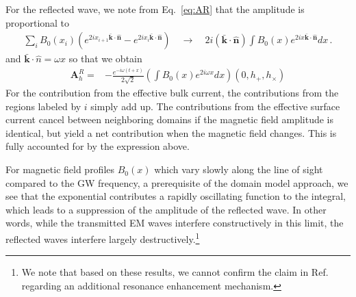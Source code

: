 \documentclass[a4paper,11pt]{article}
\begin{document}
For the reflected wave, we note from Eq.~\eqref{eq:AR} that the amplitude is proportional to
\begin{align}
 \sum_i  B_0(x_{i} ) \left( e^{2 i x_{i+1} \bar{\bm k}\cdot\hat{\bm n}} - e^{2 i x_{i} \bar{\bm k}\cdot\hat{\bm n}} \right) 
 \quad \rightarrow \quad 2 i (\bar{\bm{k}} \cdot \hat{\bm n}) \int B_0 (x) e^{2 i x \bar{\bm k} \cdot \hat{\bm n}} dx \,.
\end{align}
%
and $\bar{\bm k} \cdot \hat{n} = \omega x$ so that we obtain
%
\begin{align}
     {\bm A}_{h}^{R}  = &
      - \frac{e^{-i \omega (t + x) }}{2\sqrt{2}}
         \left( \int B_0 (x) e^{ 2 i \omega x } dx \right) 
         \left( 0, h_{+}, h_{\times} \right)
       \label{eq:Gen_R}
\end{align}
%
For the contribution from the effective bulk current, the contributions from the regions labeled by $i$ simply add up.
%
The contributions from the effective surface current cancel between neighboring domains if the magnetic field amplitude is identical, but yield a net contribution when the magnetic field changes.
%
This is fully accounted for by the expression above.




For magnetic field profiles $B_0(x)$ which vary slowly along the line of sight compared to the GW frequency, a prerequisite of the domain model approach, we see that the exponential contributes a rapidly oscillating function to the integral, which leads to a suppression of the amplitude of the reflected wave.
%
In other words, while the transmitted EM waves interfere constructively in this limit, the reflected waves interfere largely destructively.\footnote{
We note that based on these results, we cannot confirm the claim in Ref.~\cite{Addazi:2024kbq} regarding an additional resonance enhancement mechanism.}
\end{document}
